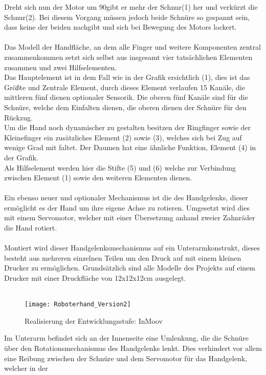 \documentclass[titlepage,12pt,twoside]{article}
\begin{document}
Dreht sich nun der Motor um 90\textdegree gibt er mehr der Schnur(1) her und verkürzt die Schnur(2). Bei diesem Vorgang müssen jedoch beide Schnüre so gespannt sein, dass keine der beiden nachgibt und sich bei Bewegung des Motors lockert. \\
\\
Das Modell der Handfläche, an dem alle Finger und weitere Komponenten zentral zusammenkommen setzt sich selbst aus insgesamt vier tatsächlichen Elementen zusammen und zwei Hilfselementen. \\
Das Hauptelement ist in dem Fall wie in der Grafik ersichtlich (1), dies ist das Größte und Zentrale Element, durch dieses Element verlaufen 15 Kanäle, die mittleren fünf dienen optionaler Sensorik. Die oberen fünf Kanäle sind für die Schnüre, 
welche dem Einfalten dienen, die oberen dienen der Schnüre für den Rückzug. \\
Um die Hand noch dynamischer zu gestalten besitzen der Ringfinger sowie der Kleinefinger ein zusätzliches Element (2) sowie (3), welches sich bei Zug auf wenige Grad mit faltet. Der Daumen hat eine ähnliche Funktion, Element (4) in der Grafik. \\
Als Hilfselement werden hier die Stifte (5) und (6) welche zur Verbindung zwischen Element (1) sowie den weiteren Elementen dienen. \\
\\
Ein ebenso neuer und optionaler Mechanismus ist die des Handgelenks, dieser ermöglicht es der Hand um ihre eigene Achse zu rotieren. Umgesetzt wird dies mit einem Servomotor, welcher mit einer Übersetzung anhand zweier Zahnräder die Hand rotiert. \\
\\
Montiert wird dieser Handgelenksmechanismus auf ein Unterarmkonstrukt, dieses besteht aus mehreren einzelnen Teilen um den Druck auf mit einem kleinen Drucker zu ermöglichen. Grundsätzlich sind alle Modelle des Projekts  auf einem Drucker 
mit einer Druckfläche von 12x12x12cm ausgelegt. \\
\\
\begin{figure}[H]
	\begin{center}
		\scalebox{1.2}
		{\texttt{[image: Roboterhand\_Version2]}}
		\caption{Realisierung der Entwicklungsstufe: InMoov}
		\label{fig:Roboterhand_Version2}			
	\end{center}
\end{figure}
\hfill \break
Im Unterarm befindet sich an der Innenseite eine Umlenkung, die die Schnüre über den Rotationsmechanismus des Handgelenks lenkt. Dies verhindert vor allem eine Reibung zwischen der Schnüre und dem Servomotor für das Handgelenk, welcher in der 
\end{document}
